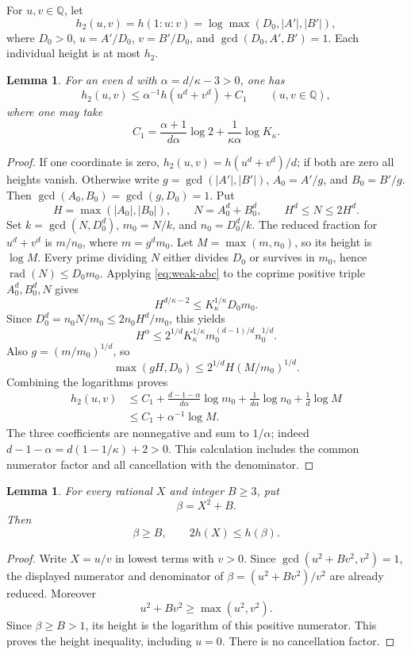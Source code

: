 \documentclass[11pt,a4paper]{article}
\newtheorem{lemma}[theorem]{Lemma}
\newcommand{\Q}{\mathbb Q}\newcommand{\Z}{\mathbb Z}
\begin{document}
For $u,v\in\Q$, let
\[
 h_2(u,v)=h(1:u:v)=\log\max(D_0,|A'|,|B'|),
\]
where $D_0>0$, $u=A'/D_0$, $v=B'/D_0$, and
$\gcd(D_0,A',B')=1$. Each individual height is at most $h_2$.

\begin{lemma}\label{lem:powers}
For an even $d$ with $\alpha=d/\kappa-3>0$, one has
\[
                  h_2(u,v)\le\alpha^{-1}h(u^d+v^d)+C_1
                     \qquad(u,v\in\Q),
\]
where one may take
\[
 C_1=\frac{\alpha+1}{d\alpha}\log2
                  +\frac1{\kappa\alpha}\log K_\kappa.
\]
\end{lemma}
\begin{proof}
If one coordinate is zero, $h_2(u,v)=h(u^d+v^d)/d$;
if both are zero all heights vanish. Otherwise write
$g=\gcd(|A'|,|B'|)$, $A_0=A'/g$, and $B_0=B'/g$.
Then $\gcd(A_0,B_0)=\gcd(g,D_0)=1$. Put
\[
 H=\max(|A_0|,|B_0|),\qquad N=A_0^d+B_0^d,
 \qquad H^d\le N\le2H^d.
\]
Set $k=\gcd(N,D_0^d)$, $m_0=N/k$, and $n_0=D_0^d/k$.
The reduced fraction for $u^d+v^d$ is $m/n_0$, where
$m=g^d m_0$. Let $M=\max(m,n_0)$, so its height is $\log M$.
Every prime dividing $N$ either divides $D_0$ or survives in
$m_0$, hence $\operatorname{rad}(N)\le D_0m_0$.
Applying \eqref{eq:weak-abc} to the coprime positive triple
$A_0^d,B_0^d,N$ gives
\[
               H^{d/\kappa-2}\le K_\kappa^{1/\kappa}D_0m_0.
\]
Since $D_0^d=n_0N/m_0\le2n_0H^d/m_0$, this yields
\[
 H^\alpha\le2^{1/d}K_\kappa^{1/\kappa}
                  m_0^{(d-1)/d}n_0^{1/d}.
\]
Also $g=(m/m_0)^{1/d}$, so
\[
                \max(gH,D_0)\le2^{1/d}H(M/m_0)^{1/d}.
\]
Combining the logarithms proves
\begin{align*}
 h_2(u,v)
 &\le C_1+\frac{d-1-\alpha}{d\alpha}\log m_0
          +\frac1{d\alpha}\log n_0+\frac1d\log M\\
 &\le C_1+\alpha^{-1}\log M.
\end{align*}
The three coefficients are nonnegative and sum to $1/\alpha$;
indeed $d-1-\alpha=d(1-1/\kappa)+2>0$.
This calculation includes the common numerator factor and all
cancellation with the denominator.
\end{proof}

\begin{lemma}\label{lem:input-height}
For every rational $X$ and integer $B\ge3$, put
\begin{equation}\label{eq:input}
                              \beta=X^2+B.
\end{equation}
Then
\[
                       \beta\ge B,\qquad 2h(X)\le h(\beta).
\]
\end{lemma}
\begin{proof}
Write $X=u/v$ in lowest terms with $v>0$. Since
$\gcd(u^2+Bv^2,v^2)=1$, the displayed numerator and denominator
of $\beta=(u^2+Bv^2)/v^2$ are already reduced. Moreover
\[
                     u^2+Bv^2\ge\max(u^2,v^2).
\]
Since $\beta\ge B>1$, its height is the logarithm of this
positive numerator. This proves the height inequality, including
$u=0$. There is no cancellation factor.
\end{proof}
\end{document}
